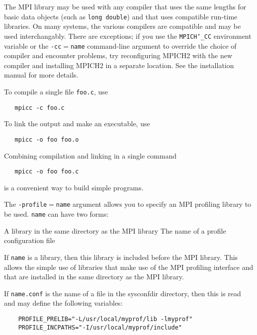 \par
{}
The MPI library may be used with any compiler that uses the same
lengths for basic data objects (such as {\tt long double}) and that
uses compatible run-time libraries.  On many systems, the various
compilers are compatible and may be used interchangably.  There are
exceptions; if you use the {\tt MPICH{\tt \char`\_}CC} environment variable or the
{\tt -cc$=$name} command-line argument to override the choice of compiler
and encounter problems, try reconfiguring MPICH2 with the new compiler
and installing MPICH2 in a separate location.  See the installation manual
for more details.
\par
{}
To compile a single file {\tt foo.c}, use
\begin{verbatim}
   mpicc -c foo.c 
\end{verbatim}

\par
To link the output and make an executable, use
\begin{verbatim}
   mpicc -o foo foo.o
\end{verbatim}

Combining compilation and linking in a single command
\begin{verbatim}
   mpicc -o foo foo.c
\end{verbatim}

is a convenient way to build simple programs.
\par
{}
The {\tt -profile$=$name} argument allows you to specify an MPI profiling
library to be used.  {\tt name} can have two forms:
\par
\nextline
A library in the same directory as the MPI library
\nextline
The name of a profile configuration file
\nextline
\par
If {\tt name} is a library, then this library is included before the MPI
library.  This allows the simple use of libraries that make use of the
MPI profiling interface and that are installed in the same directory as
the MPI library.
\par
If {\tt name.conf} is the name of a file in the sysconfdir directory, then this
is read and may define the following variables:
\par
\begin{verbatim}
    PROFILE_PRELIB="-L/usr/local/myprof/lib -lmyprof"
    PROFILE_INCPATHS="-I/usr/local/myprof/include"
\end{verbatim}

